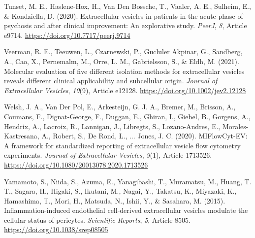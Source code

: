\documentclass[authordate, empirical]{jote-new-article}
\begin{document}
	Tunset, M. E., Haslene-Hox, H., Van Den Bossche, T., Vaaler, A. E., Sulheim, E., \& Kondziella, D. (2020). Extracellular vesicles in patients in the acute phase of psychosis and after clinical improvement: An explorative study. \emph{PeerJ},\emph{ 8}, Article e9714. \href{https://doi.org/10.7717/peerj.9714}{https://doi.org/10.7717/peerj.9714}



	Veerman, R. E., Teeuwen, L., Czarnewski, P., Gucluler Akpinar, G., Sandberg, A., Cao, X., Pernemalm, M., Orre, L. M., Gabrielsson, S., \& Eldh, M. (2021). Molecular evaluation of five different isolation methods for extracellular vesicles reveals different clinical applicability and subcellular origin. \emph{Journal of Extracellular Vesicles},\emph{ 10}(9), Article e12128. \href{https://doi.org/10.1002/jev2.12128}{https://doi.org/10.1002/jev2.12128}



	Welsh, J. A., Van Der Pol, E., Arkesteijn, G. J. A., Bremer, M., Brisson, A., Coumans, F., Dignat-George, F., Duggan, E., Ghiran, I., Giebel, B., Gorgens, A., Hendrix, A., Lacroix, R., Lannigan, J., Libregts, S., Lozano-Andres, E., Morales-Kastresana, A., Robert, S., De Rond, L., ... Jones, J. C. (2020). MIFlowCyt-EV: A framework for standardized reporting of extracellular vesicle flow cytometry experiments. \emph{Journal of Extracellular Vesicles},\emph{ 9}(1), Article 1713526. \href{https://doi.org/10.1080/20013078.2020.1713526}{https://doi.org/10.1080/20013078.2020.1713526}



	Yamamoto, S., Niida, S., Azuma, E., Yanagibashi, T., Muramatsu, M., Huang, T. T., Sagara, H., Higaki, S., Ikutani, M., Nagai, Y., Takatsu, K., Miyazaki, K., Hamashima, T., Mori, H., Matsuda, N., Ishii, Y., \& Sasahara, M. (2015). Inflammation-induced endothelial cell-derived extracellular vesicles modulate the cellular status of pericytes. \emph{Scientific Reports},\emph{ 5}, Article 8505. \href{https://doi.org/10.1038/srep08505}{https://doi.org/10.1038/srep08505}
\end{document}
